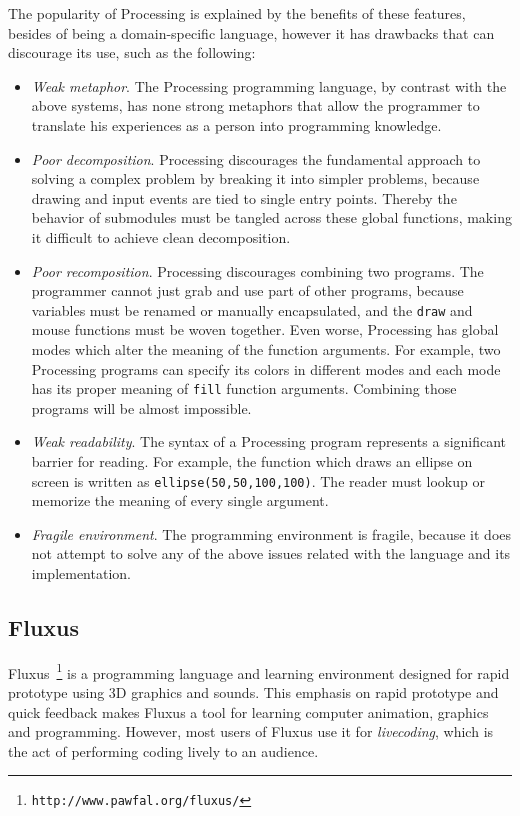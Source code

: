 The popularity of Processing is explained by the benefits of these features, besides of being a domain-specific language, however it has drawbacks that can discourage its use, such as the following:

\begin{itemize}
  \item \textit{Weak metaphor}. The Processing programming language, by contrast with the above systems, has none strong metaphors that allow the programmer to translate his experiences as a person into programming knowledge. 

  \item \textit{Poor decomposition}. Processing discourages the fundamental approach to solving a complex problem by breaking it into simpler problems, because drawing and input events are tied to single entry points. Thereby the behavior of submodules must be tangled across these global functions, making it difficult to achieve clean decomposition.

  \item \textit{Poor recomposition}. Processing discourages combining two programs. The programmer cannot just grab and use part of other programs, because variables must be renamed or manually encapsulated, and the \texttt{draw} and mouse functions must be woven together. Even worse, Processing has global modes which alter the meaning of the function arguments. For example, two Processing programs can specify its colors in different modes and each mode has its proper meaning of \texttt{fill} function arguments. Combining those programs will be almost impossible. 

  \item \textit{Weak readability}. The syntax of a Processing program represents a significant barrier for reading. For example, the function which draws an ellipse on screen is written as \texttt{ellipse(50,50,100,100)}. The reader must lookup or memorize the meaning of every single argument.

  \item \textit{Fragile environment}. The programming environment is fragile, because it does not attempt to solve any of the above issues related with the language and its implementation.
\end{itemize}

\subsection{Fluxus}
\label{subsec:fluxus}
Fluxus~\citep{griffiths2007fluxus}\footnote{\texttt{http://www.pawfal.org/fluxus/}} is a programming language and learning environment designed for rapid prototype using 3D graphics and sounds. This emphasis on rapid prototype and quick feedback makes Fluxus a tool for learning computer animation, graphics and programming. However, most users of Fluxus use it for \textit{livecoding}, which is the act of performing coding lively to an audience.

